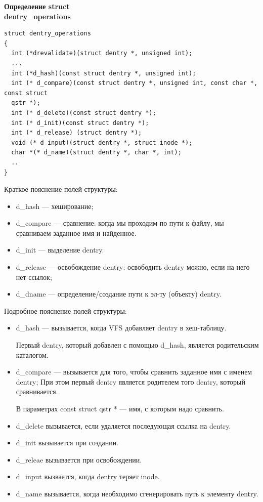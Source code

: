 \textbf{Определение struct \\ dentry\_operations}

\begin{lstlisting}
struct dentry_operations
{
  int (*drevalidate)(struct dentry *, unsigned int);
  ...
  int (*d_hash)(const struct dentry *, unsigned int);
  int (* d_compare)(const struct dentry *, unsigned int, const char *, const struct
  qstr *);
  int (* d_delete)(const struct dentry *);
  int (* d_init)(const struct dentry *);
  int (* d_release) (struct dentry *);
  void (* d_input)(struct dentry *, struct inode *);
  char *(* d_name)(struct dentry *, char *, int);
  ..
}
\end{lstlisting}

Краткое пояснение полей структуры:
\begin{itemize}
\item d\_hash — хеширование;
\item d\_compare — сравнение: когда мы проходим по пути к файлу, мы сравниваем заданное имя и найденное.
\item d\_init — выделение dentry.
\item d\_release — освобождение dentry: освободить dentry можно, если на него нет ссылок;
\item d\_dname — определение/создание пути к эл-ту (объекту) dentry.
\end{itemize}

Подробное пояснение полей структуры:
\begin{itemize}
\item d\_hash — вызывается, когда VFS добавляет dentry в хеш-таблицу.

Первый dentry, который добавлен с помощью d\_hash, является родительским каталогом.
\item d\_compare — вызывается для того, чтобы сравнить заданное имя с именем dentry; При этом первый dentry является родителем того dentry, который сравнивается.

В параметрах const struct qstr * — имя, с которым надо сравнить.
\item d\_delete вызывается, если удаляется последующая ссылка на dentry.
\item d\_init вызывается при создании.
\item d\_releae вызывается при освобождении.
\item d\_input вызвается, когда dentry теряет inode.
\item d\_name вызывается, когда необходимо сгенерировать путь к элементу dentry.
\end{itemize}

